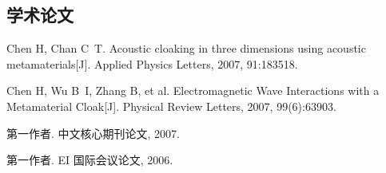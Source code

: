 
\begin{achievements}

	\subsection*{学术论文}

		\begin{bibliolist}{00}
  			\item Chen H, Chan C~T. Acoustic cloaking in three dimensions using acoustic metamaterials[J]. Applied Physics Letters, 2007, 91:183518.
  			\item Chen H, Wu B~I, Zhang B, et al. Electromagnetic Wave Interactions with a Metamaterial Cloak[J]. Physical Review Letters, 2007, 99(6):63903.
		\end{bibliolist}

		\begin{bibliolist*}{00}
  			\item 第一作者. 中文核心期刊论文, 2007.
  			\item 第一作者. EI 国际会议论文, 2006.
		\end{bibliolist*}

\end{achievements}
